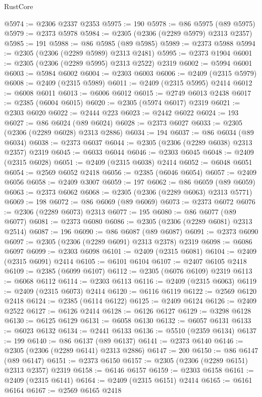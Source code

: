 \begin{lexlean}{RustCore}
\begin{coremodule}
@5974 := @2306 @2337 @2353
@5975 := 190
@5978 := @86 @5975 (@89 @5975)
@5979 := @2373 @5978
@5984 := @2305 (@2306 (@2289 @5979) @2313 @2357)
@5985 := 191
@5988 := @86 @5985 (@89 @5985)
@5989 := @2373 @5988
@5994 := @2305 (@2306 (@2289 @5989) @2313 @2481)
@5995 := @2373 @1904
@6001 := @2305 (@2306 (@2289 @5995) @2313 @2522) @2319
@6002 := @5994 @6001
@6003 := @5984 @6002
@6004 := @2303 @6003
@6006 := @2409 (@2315 @5979)
@6008 := @2409 (@2315 @5989)
@6011 := @2409 (@2315 @5995) @2414
@6012 := @6008 @6011
@6013 := @6006 @6012
@6015 := @2749 @6013 @2438
@6017 := @2385 (@6004 @6015)
@6020 := @2305 (@5974 @6017) @2319
@6021 := @2303 @6020
@6022 := @2444 @223
@6023 := @2442 @6022
@6024 := 193
@6027 := @86 @6024 (@89 @6024)
@6028 := @2373 @6027
@6033 := @2305 (@2306 (@2289 @6028) @2313 @2886)
@6034 := 194
@6037 := @86 @6034 (@89 @6034)
@6038 := @2373 @6037
@6044 := @2305 (@2306 (@2289 @6038) @2313 @2357) @2319
@6045 := @6033 @6044
@6046 := @2303 @6045
@6048 := @2409 (@2315 @6028)
@6051 := @2409 (@2315 @6038) @2414
@6052 := @6048 @6051
@6054 := @2569 @6052 @2418
@6056 := @2385 (@6046 @6054)
@6057 := @2409 @6056
@6058 := @2409 @3007
@6059 := 197
@6062 := @86 @6059 (@89 @6059)
@6063 := @2373 @6062
@6068 := @2305 (@2306 (@2289 @6063) @2313 @5771)
@6069 := 198
@6072 := @86 @6069 (@89 @6069)
@6073 := @2373 @6072
@6076 := @2306 (@2289 @6073) @2313
@6077 := 195
@6080 := @86 @6077 (@89 @6077)
@6081 := @2373 @6080
@6086 := @2305 (@2306 (@2289 @6081) @2313 @2514)
@6087 := 196
@6090 := @86 @6087 (@89 @6087)
@6091 := @2373 @6090
@6097 := @2305 (@2306 (@2289 @6091) @2313 @2378) @2319
@6098 := @6086 @6097
@6099 := @2303 @6098
@6101 := @2409 (@2315 @6081)
@6104 := @2409 (@2315 @6091) @2414
@6105 := @6101 @6104
@6107 := @2407 @6105 @2418
@6109 := @2385 (@6099 @6107)
@6112 := @2305 (@6076 @6109) @2319
@6113 := @6068 @6112
@6114 := @2303 @6113
@6116 := @2409 (@2315 @6063)
@6119 := @2409 (@2315 @6073) @2414
@6120 := @6116 @6119
@6122 := @2569 @6120 @2418
@6124 := @2385 (@6114 @6122)
@6125 := @2409 @6124
@6126 := @2409 @2522
@6127 := @6126 @2414
@6128 := @6126 @6127
@6129 := @3298 @6128
@6130 := @6125 @6129
@6131 := @6058 @6130
@6132 := @6057 @6131
@6133 := @6023 @6132
@6134 := @2441 @6133
@6136 := @5510 (@2359 @6134)
@6137 := 199
@6140 := @86 @6137 (@89 @6137)
@6141 := @2373 @6140
@6146 := @2305 (@2306 (@2289 @6141) @2313 @2886)
@6147 := 200
@6150 := @86 @6147 (@89 @6147)
@6151 := @2373 @6150
@6157 := @2305 (@2306 (@2289 @6151) @2313 @2357) @2319
@6158 := @6146 @6157
@6159 := @2303 @6158
@6161 := @2409 (@2315 @6141)
@6164 := @2409 (@2315 @6151) @2414
@6165 := @6161 @6164
@6167 := @2569 @6165 @2418

\end{coremodule}
\end{lexlean}
